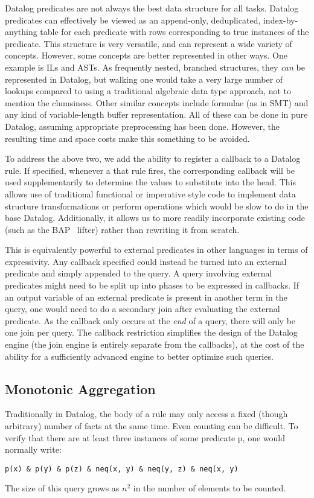 Datalog predicates are not always the best data structure for all tasks.
Datalog predicates can effectively be viewed as an append-only, deduplicated, index-by-anything table for each predicate with rows corresponding to true instances of the predicate.
This structure is very versatile, and can represent a wide variety of concepts.
However, some concepts are better represented in other ways.
One example is ILs and ASTs.
As frequently nested, branched structures, they \emph{can} be represented in Datalog, but walking one would take a very large number of lookups compared to using a traditional algebraic data type approach, not to mention the clumsiness.
Other similar concepts include formulae (as in SMT) and any kind of variable-length buffer representation.
All of these can be done in pure Datalog, assuming appropriate preprocessing has been done.
However, the resulting time and space costs make this something to be avoided.

To address the above two, we add the ability to register a callback to a Datalog rule.
If specified, whenever a that rule fires, the corresponding callback will be used supplementarily to determine the values to substitute into the head.
This allows use of traditional functional or imperative style code to implement data structure transformations or perform operations which would be slow to do in the base Datalog.
Additionally, it allows us to more readily incorporate existing code (such as the BAP~\cite{bap} lifter) rather than rewriting it from scratch.

This is equivalently powerful to external predicates in other languages in terms of expressivity.
Any callback specified could instead be turned into an external predicate and simply appended to the query.
A query involving external predicates might need to be split up into phases to be expressed in callbacks.
If an output variable of an external predicate is present in another term in the query, one would need to do a secondary join after evaluating the external predicate.
As the callback only occurs at the \emph{end} of a query, there will only be one join per query.
The callback restriction simplifies the design of the Datalog engine (the join engine is entirely separate from the callbacks), at the cost of the ability for a sufficiently advanced engine to better optimize such queries.

\subsection{Monotonic Aggregation}
Traditionally in Datalog, the body of a rule may only access a fixed (though arbitrary) number of facts at the same time.
Even counting can be difficult.
To verify that there are at least three instances of some predicate p, one would normally write:
\begin{verbatim}
p(x) & p(y) & p(z) & neq(x, y) & neq(y, z) & neq(x, y)
\end{verbatim}
The size of this query grows as $n^2$ in the number of elements to be counted.

